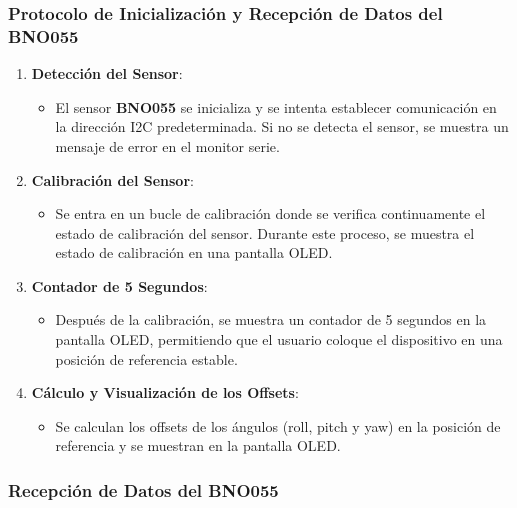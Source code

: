     \subsubsection{Protocolo de Inicialización y Recepción de Datos del BNO055}
        \begin{enumerate}
            \item \textbf{Detección del Sensor}:
            \begin{itemize}
                \item El sensor \textbf{BNO055} se inicializa y se intenta establecer comunicación en la dirección I2C predeterminada. Si no se detecta el sensor, se muestra un mensaje de error en el monitor serie.
            \end{itemize}

            \item \textbf{Calibración del Sensor}:
            \begin{itemize}
                \item Se entra en un bucle de calibración donde se verifica continuamente el estado de calibración del sensor. Durante este proceso, se muestra el estado de calibración en una pantalla OLED.
            \end{itemize}

            \item \textbf{Contador de 5 Segundos}:
            \begin{itemize}
                \item Después de la calibración, se muestra un contador de 5 segundos en la pantalla OLED, permitiendo que el usuario coloque el dispositivo en una posición de referencia estable.
            \end{itemize}

            \item \textbf{Cálculo y Visualización de los Offsets}:
            \begin{itemize}
                \item Se calculan los offsets de los ángulos (roll, pitch y yaw) en la posición de referencia y se muestran en la pantalla OLED.
            \end{itemize}
        \end{enumerate}


    \subsubsection{Recepción de Datos del BNO055}

